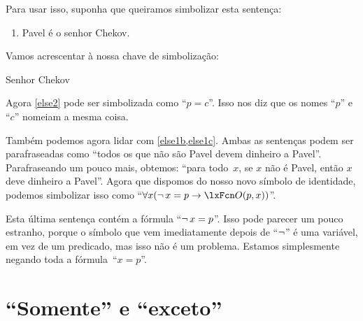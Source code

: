 Para usar isso, suponha que queiramos simbolizar esta sentença:
\begin{enumerate}
\item\label{else2} Pavel é o senhor Chekov.
\end{enumerate}
Vamos acrescentar à nossa chave de simbolização:
	\begin{ekey}
\item[c] Senhor Chekov
	\end{ekey}
Agora \cref*{else2} pode ser simbolizada como \textquotedblleft $p=c$\textquotedblright{}. Isso nos diz que os nomes \textquotedblleft $p$\textquotedblright{} e \textquotedblleft $c$\textquotedblright{} nomeiam a mesma coisa.

Também podemos agora lidar com \cref{else1b,else1c}. Ambas as sentenças podem ser parafraseadas como \textquotedblleft todos os que não são Pavel devem dinheiro a Pavel\textquotedblright{}. Parafraseando um pouco mais, obtemos: \textquotedblleft para todo~$x$, se $x$ não é Pavel, então $x$ deve dinheiro a Pavel\textquotedblright{}. Agora que dispomos do nosso novo símbolo de identidade, podemos simbolizar isso como \textquotedblleft $\forall x (\enot\, {x = p} \eif \atom{O}{p,x})$\textquotedblright{}.

Esta última sentença contém a fórmula \textquotedblleft $\neg\, {x = p}$\textquotedblright{}. Isso pode parecer um pouco estranho, porque o símbolo que vem imediatamente depois de \textquotedblleft $\neg$\textquotedblright{} é uma variável, em vez de um predicado, mas isso não é um problema. Estamos simplesmente negando toda a fórmula~\textquotedblleft $x = p$\textquotedblright{}.

\section{\textquotedblleft Somente\textquotedblright{} e \textquotedblleft exceto\textquotedblright{}}

